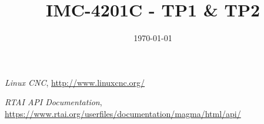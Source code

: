 \documentclass[a4paper, 11pt]{article}
\title{
	\textbf{IMC-4201C - TP1 \& TP2}
}
\date{\today}
\begin{document}
\maketitle
\newpage

\tableofcontents
\newpage


\newpage


\newpage


\newpage


\newpage

\begin{thebibliography}{5}
	\emph{Linux CNC}, \href{http://www.linuxcnc.org/}{http://www.linuxcnc.org/}

 \emph{RTAI API Documentation}, \href{https://www.rtai.org/userfiles/documentation/magma/html/api/}{https://www.rtai.org/userfiles/documentation/magma/html/api/}
\end{thebibliography}
\end{document}
